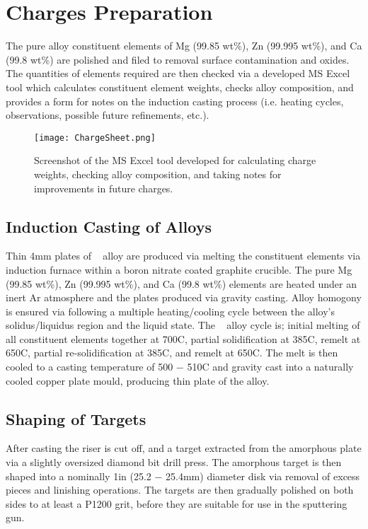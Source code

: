 \documentclass[a4paper,12pt,oneside]{report}%
\begin{document}
\section{Charges Preparation}
The pure alloy constituent elements of Mg (99.85 wt\%), Zn (99.995 wt\%), and Ca (99.8 wt\%) are polished and filed to removal surface contamination and oxides. The quantities of elements required are then checked via a developed MS Excel tool which calculates constituent element weights, checks alloy composition, and provides a form for notes on the induction casting process (i.e. heating cycles, observations, possible future refinements, etc.).

\begin{figure}[htbp]
	\centering
	\texttt{[image: ChargeSheet.png]}
	\caption{Screenshot of the MS Excel tool developed for calculating charge weights, checking alloy composition, and taking notes for improvements in future charges.}
	\label{fig:ChargeSheet}
\end{figure}

\subsection{Induction Casting of Alloys}
Thin 4mm plates  of \MgZnCa~ alloy are produced via melting the constituent elements via induction furnace within a boron nitrate coated graphite crucible. The pure Mg (99.85 wt\%), Zn (99.995 wt\%), and Ca (99.8 wt\%) elements are heated under an inert Ar atmosphere and the plates produced via gravity casting. Alloy homogony is ensured via following a multiple heating/cooling cycle between the alloy's solidus/liquidus region and the liquid state. The \MgZnCa~ alloy cycle is; initial melting of all constituent elements together at 700\degree C, partial solidification at 385\degree C, remelt at 650\degree C, partial re-solidification at 385\degree C, and remelt at 650\degree C. The melt is then cooled to a casting temperature of 500 $-$ 510\degree C and gravity cast into a naturally cooled copper plate mould, producing thin plate of the alloy. 

\subsection{Shaping of Targets}
After casting the riser is cut off, and a target extracted from the amorphous plate via a slightly oversized diamond bit drill press. The amorphous target is then shaped into a nominally 1in (25.2 $-$ 25.4mm) diameter disk via removal of excess pieces and linishing operations. The targets are then gradually polished on both sides to at least a P1200 grit, before they are suitable for use in the sputtering gun. 
\end{document}
